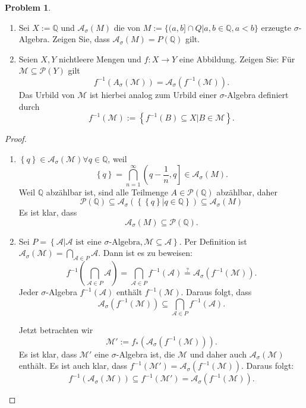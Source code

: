 \documentclass[prb,12pt]{revtex4-2}
\theoremstyle{definition}
\newtheorem{Problem}{Problem}
\theoremstyle{definition}
\newenvironment{parts}{\begin{enumerate}[label=(\alph*)]}{\end{enumerate}}
\newcommand{\Q}{\mathbb{Q}}
\begin{document}
\begin{Problem}
	\begin{parts}
		
	 \item Sei $X := \Q$ und $\mathcal A_\sigma (M)$ die von $M := \{(a, b] \cap Q | a, b \in \Q, a < b\}$ erzeugte $\sigma$-Algebra. Zeigen Sie, dass $\mathcal A_\sigma (M ) = P(\Q)$ gilt.

 \item Seien $X, Y$ nichtleere Mengen und $f:X\to Y$ eine Abbildung. Zeigen Sie: F\"{u}r $\mathcal M\subseteq \mathcal{P}(Y)$ gilt
	 \[
		 f^{-1}\left( A_\sigma(\mathcal M) \right) =\mathcal A_\sigma\left( f^{-1}(\mathcal M) \right) 
	 .\]
	 Das Urbild von $\mathcal M$ ist hierbei analog zum Urbild einer $\sigma$-Algebra definiert durch
	 \[
		 f^{-1}(\mathcal M):=\left\{ f^{-1}(B)\subseteq X|B\in \mathcal M \right\} 
	 .\] 
	\end{parts}
\end{Problem}

\begin{proof}
	\begin{parts}
	\item $\left\{ q \right\} \in \mathcal A_\sigma(\mathcal M)\forall q\in \Q$, weil
		\[
			\left\{ q \right\} =\bigcap_{n=1}^\infty \left(q-\frac{1}{n}, q\right]\in \mathcal A_\sigma(M) 
		.\] 
		Weil $\Q$ abz\"{a}hlbar ist, sind alle Teilmenge $A\in \mathcal P(\Q)$ abz\"{a}hlbar, daher 
		\[
		\mathcal P(\Q)\subseteq \mathcal A_\sigma\left( \left\{ \left\{ q \right\} | q\in \Q \right\}  \right) \subseteq \mathcal A_\sigma(M)
	\]
		Es ist klar, dass
		\[
		\mathcal A_\sigma(M)\subseteq \mathcal P(\Q)
		.\]
	\item 
	
		Sei $ P=\left\{ \mathcal A| \mathcal A\text{ ist eine }\sigma\text{-Algebra},\mathcal M \subseteq \mathcal A \right\} $. Per Definition ist $\mathcal A_\sigma(\mathcal M)=\bigcap_{\mathcal A\in P} \mathcal A$. Dann ist es zu beweisen: 
		\[
			f^{-1}\left( \bigcap_{\mathcal A\in P} \mathcal A \right) =\bigcap_{\mathcal A\in P} f^{-1}(\mathcal A)\overset{?}{=}\mathcal A_\sigma\left( f^{-1}\left( \mathcal M \right)  \right) 
		.\]
		Jeder $\sigma$-Algebra $f^{-1}\left( \mathcal A \right) $ enthält $f^{-1}\left( \mathcal M \right) $. Daraus folgt, dass
		\[
			\mathcal A_\sigma \left( f^{-1}\left( \mathcal M \right)  \right) \subseteq \bigcap_{\mathcal A\in P} f^{-1}(\mathcal A)
		.\] 

	Jetzt betrachten wir
	\[
		\mathcal{M}':=f_*\left( \mathcal{A}_\sigma \left( f^{-1}(\mathcal{M}) \right)  \right) 
	.\]
	Es ist klar, dass $\mathcal{M}'$ eine $\sigma$-Algebra ist, die $\mathcal{M}$ und daher auch $\mathcal{A}_\sigma \left( \mathcal{M} \right) $ enth\"{a}lt. Es ist auch klar, dass $f^{-1}\left( \mathcal{M}' \right)=\mathcal{A}_\sigma\left( f^{-1}\left( \mathcal{M} \right)  \right)  $. Daraus folgt:
	\[
		f^{-1}\left( \mathcal{A}_\sigma \left( \mathcal{M} \right)  \right) \subseteq f^{-1}\left( \mathcal{ M}' \right) =\mathcal{A}_\sigma\left( f^{-1}\left( \mathcal{ M} \right)  \right)
	.\] 
	\end{parts}
\end{proof}
\end{document}
